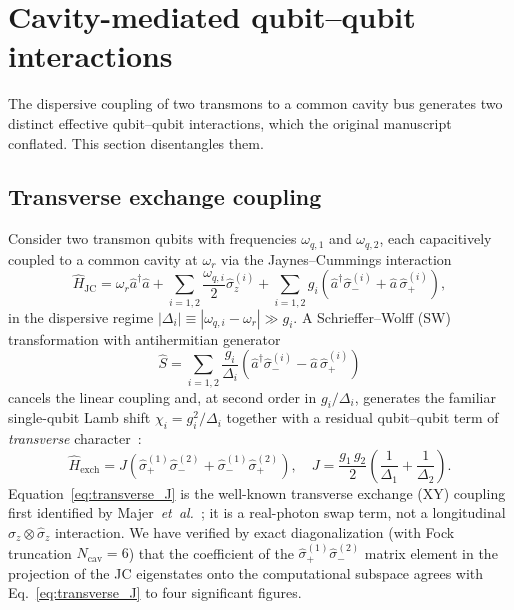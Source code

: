 
\section{Cavity-mediated qubit--qubit interactions}
\label{sec:cavity_mediated_couplings}

The dispersive coupling of two transmons to a common cavity bus generates two
distinct effective qubit--qubit interactions, which the original manuscript
conflated. This section disentangles them.

\subsection{Transverse exchange coupling}
\label{subsec:transverse_J}

Consider two transmon qubits with frequencies $\omega_{q,1}$ and $\omega_{q,2}$,
each capacitively coupled to a common cavity at $\omega_r$ via the
Jaynes--Cummings interaction
\begin{equation}
\hat{H}_{\text{JC}} = \omega_r \hat{a}^{\dagger}\hat{a}
+ \sum_{i=1,2}\frac{\omega_{q,i}}{2}\hat{\sigma}_z^{(i)}
+ \sum_{i=1,2} g_i\!\left(\hat{a}^{\dagger}\hat{\sigma}_-^{(i)}
+ \hat{a}\,\hat{\sigma}_+^{(i)}\right) ,
\label{eq:JC_2qubit}
\end{equation}
in the dispersive regime $|\Delta_i| \equiv |\omega_{q,i} - \omega_r| \gg g_i$.
A Schrieffer--Wolff (SW) transformation with antihermitian generator
\begin{equation}
\hat{S} = \sum_{i=1,2}\frac{g_i}{\Delta_i}
\!\left(\hat{a}^{\dagger}\hat{\sigma}_-^{(i)}
- \hat{a}\,\hat{\sigma}_+^{(i)}\right)
\end{equation}
cancels the linear coupling and, at second order in $g_i/\Delta_i$, generates the
familiar single-qubit Lamb shift
$\chi_i = g_i^2/\Delta_i$ together with a residual qubit--qubit term of
\emph{transverse} character~\cite{Majer2007,blais2021circuit}:
\begin{equation}
\hat{H}_{\text{exch}} = J\!\left(\hat{\sigma}_+^{(1)}\hat{\sigma}_-^{(2)}
+ \hat{\sigma}_-^{(1)}\hat{\sigma}_+^{(2)}\right),\quad
J = \frac{g_1\,g_2}{2}\!\left(\frac{1}{\Delta_1} + \frac{1}{\Delta_2}\right).
\label{eq:transverse_J}
\end{equation}
Equation~\eqref{eq:transverse_J} is the well-known transverse exchange (XY)
coupling first identified by Majer~\textit{et~al.}~\cite{Majer2007}; it is a
real-photon swap term, not a longitudinal $\hat{\sigma}_z\!\otimes\!\hat{\sigma}_z$
interaction. We have verified by exact diagonalization (with Fock
truncation $N_{\text{cav}} = 6$) that the coefficient of the
$\hat{\sigma}_+^{(1)}\hat{\sigma}_-^{(2)}$ matrix element in the projection of
the JC eigenstates onto the computational subspace agrees with
Eq.~\eqref{eq:transverse_J} to four significant figures.


